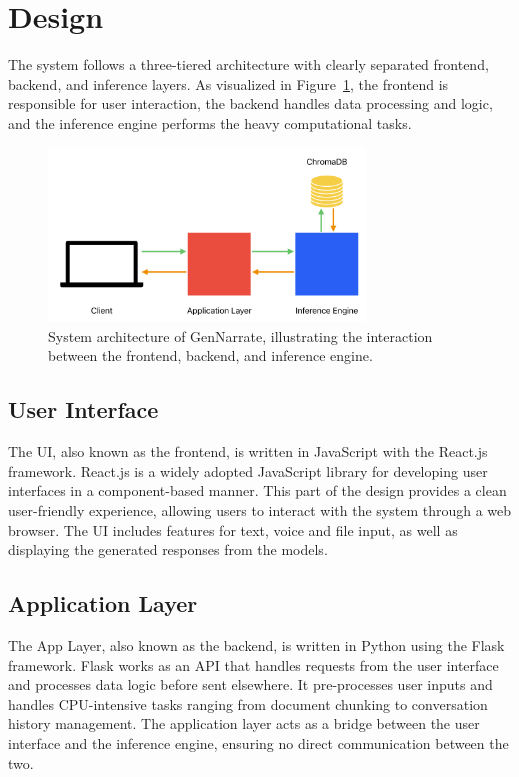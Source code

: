 \documentclass[twocolumn]{article}
\begin{document}
\section{Design}
The system follows a three-tiered architecture with clearly separated frontend, backend, and inference layers. As visualized in Figure~\ref{fig:architecture}, the frontend is responsible for user interaction, the backend handles data processing and logic, and the inference engine performs the heavy computational tasks.

\begin{figure}[htb]
    \centering
    \includegraphics[width=0.75\textwidth]{imgs/architecture.png}
    \caption{System architecture of GenNarrate, illustrating the interaction between the frontend, backend, and inference engine.}
    \label{fig:architecture}
\end{figure}

\subsection{User Interface}
The UI, also known as the frontend, is written in JavaScript with the React.js\cite{reactjs} framework. React.js is a widely adopted JavaScript library for developing user interfaces in a component-based manner. This part of the design provides a clean user-friendly experience, allowing users to interact with the system through a web browser. The UI includes features for text, voice and file input, as well as displaying the generated responses from the models.

\subsection{Application Layer}
The App Layer, also known as the backend, is written in Python using the Flask framework\cite{flaskdocs}. Flask works as an API that handles requests from the user interface and processes data logic before sent elsewhere. It pre-processes user inputs and handles CPU-intensive tasks ranging from document chunking to conversation history management. The application layer acts as a bridge between the user interface and the inference engine, ensuring no direct communication between the two.
\end{document}
